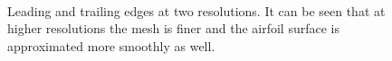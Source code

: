 \documentclass[12pt, a4paper]{article}
\begin{document}
            \begin{figure}[htbp]
                \centering
                 \qquad
                 \\
                 \qquad
                \caption{Leading and trailing edges at two resolutions. It can be seen that at higher resolutions the mesh is finer and the airfoil surface is approximated more smoothly as well.}
                \label{fig_mesh_edges}
            \end{figure}
            
\end{document}
